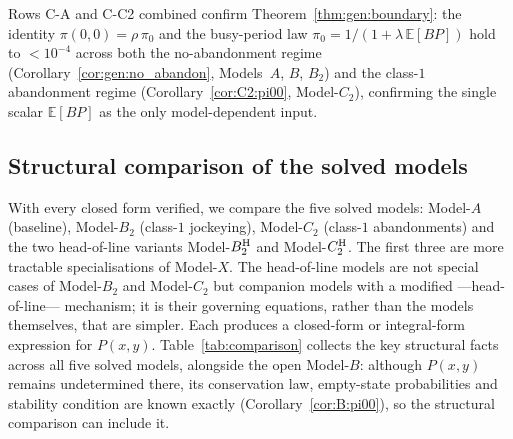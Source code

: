 Rows C-A and C-C2 combined confirm Theorem~\ref{thm:gen:boundary}: the identity $\pi(0,0)=\rho\,\pi_0$ and the busy-period law $\pi_0=1/(1+\lambda\,\mathbb{E}[BP])$ hold to $<10^{-4}$ across both the no-abandonment regime (Corollary~\ref{cor:gen:no_abandon}, Models~$A$, $B$, $B_2$) and the class-$1$ abandonment regime (Corollary~\ref{cor:C2:pi00}, Model-$C_2$), confirming the single scalar $\mathbb{E}[BP]$ as the only model-dependent input.

\subsection{Structural comparison of the solved models}
\label{sec:comparison}

With every closed form verified, we compare the five solved models: Model-$A$ (baseline), Model-$B_2$ (class-$1$ jockeying), Model-$C_2$ (class-$1$ abandonments) and the two head-of-line variants Model-$B_2^{\mathrm{H}}$ and Model-$C_2^{\mathrm{H}}$. The first three are more tractable specialisations of Model-$X$. The head-of-line models are not special cases of Model-$B_2$ and Model-$C_2$ but companion models with a modified ---head-of-line--- mechanism; it is their governing equations, rather than the models themselves, that are simpler. Each produces a closed-form or integral-form expression for $P(x,y)$. Table~\ref{tab:comparison} collects the key structural facts across all five solved models, alongside the open Model-$B$: although $P(x,y)$ remains undetermined there, its conservation law, empty-state probabilities and stability condition are known exactly (Corollary~\ref{cor:B:pi00}), so the structural comparison can include it.

